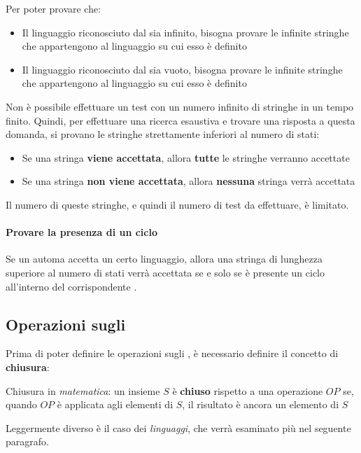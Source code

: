 \documentclass[italian, 10pt]{article}
\begin{document}
Per poter provare che:

\begin{itemize}
  \item Il linguaggio riconosciuto dal \FSA sia infinito, bisogna provare le infinite stringhe che appartengono al linguaggio su cui esso è definito
  \item Il linguaggio riconosciuto dal \FSA sia vuoto, bisogna provare le infinite stringhe che appartengono al linguaggio su cui esso è definito
\end{itemize}

Non è possibile effettuare un test con un numero infinito di stringhe in un tempo finito.
Quindi, per effettuare una ricerca esaustiva e trovare una risposta a questa domanda, si provano le stringhe strettamente inferiori al numero di stati:

\begin{itemize}[label=\(\Rightarrow\)]
  \item Se una stringa \textbf{viene accettata}, allora \textbf{tutte} le stringhe verranno accettate
  \item Se una stringa \textbf{non viene accettata}, allora \textbf{nessuna} stringa verrà accettata
\end{itemize}

Il numero di queste stringhe, e quindi il numero di test da effettuare, è limitato.

\paragraph{Provare la presenza di un ciclo}

Se un automa accetta un certo linguaggio, allora una stringa di lunghezza superiore al numero di stati verrà accettata se e solo se è presente un ciclo all'interno del corrispondente \FSA.

\subsection{Operazioni sugli \FSA}

Prima di poter definire le operazioni sugli \FSA, è necessario definire il concetto di \textbf{chiusura}:

Chiusura in \textit{matematica}: un insieme \(S\) è \textbf{chiuso} rispetto a una operazione \(OP\) se, quando \(OP\) è applicata agli elementi di \(S\), il risultato è ancora un elemento di \(S\)

Leggermente diverso è il caso dei \textit{linguaggi}, che verrà esaminato più nel seguente paragrafo.
\end{document}
